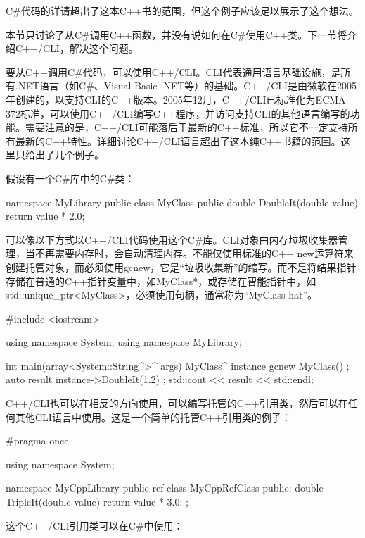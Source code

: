 C\#代码的详请超出了这本C++书的范围，但这个例子应该足以展示了这个想法。

本节只讨论了从C\#调用C++函数，并没有说如何在C\#使用C++类。下一节将介绍C++/CLI，解决这个问题。


要从C++调用C\#代码，可以使用C++/CLI。CLI代表通用语言基础设施，是所有.NET语言（如C\#、Visual Basic .NET等）的基础。C++/CLI是由微软在2005年创建的，以支持CLI的C++版本。2005年12月，C++/CLI已标准化为ECMA-372标准，可以使用C++/CLI编写C++程序，并访问支持CLI的其他语言编写的功能。需要注意的是，C++/CLI可能落后于最新的C++标准，所以它不一定支持所有最新的C++特性。详细讨论C++/CLI语言超出了这本纯C++书籍的范围。这里只给出了几个例子。

假设有一个C\#库中的C\#类：

\begin{cpp}
namespace MyLibrary
{
    public class MyClass
    {
        public double DoubleIt(double value) { return value * 2.0; }
    }
}
\end{cpp}

可以像以下方式以C++/CLI代码使用这个C\#库。CLI对象由内存垃圾收集器管理，当不再需要内存时，会自动清理内存。不能仅使用标准的C++ new运算符来创建托管对象，而必须使用gcnew，它是“垃圾收集新”的缩写。而不是将结果指针存储在普通的C++指针变量中，如MyClass*，或存储在智能指针中，如std::unique\_ptr<MyClass>，必须使用句柄，通常称为“MyClass hat”。

\begin{cpp}
#include <iostream>

using namespace System;
using namespace MyLibrary;

int main(array<System::String^>^ args)
{
    MyClass^ instance { gcnew MyClass() };
    auto result { instance->DoubleIt(1.2) };
    std::cout << result << std::endl;
}
\end{cpp}

C++/CLI也可以在相反的方向使用，可以编写托管的C++引用类，然后可以在任何其他CLI语言中使用。这是一个简单的托管C++引用类的例子：

\begin{cpp}
#pragma once

using namespace System;

namespace MyCppLibrary
{
    public ref class MyCppRefClass
    {
        public:
            double TripleIt(double value) { return value * 3.0; }
    };
}
\end{cpp}

这个C++/CLI引用类可以在C\#中使用：

